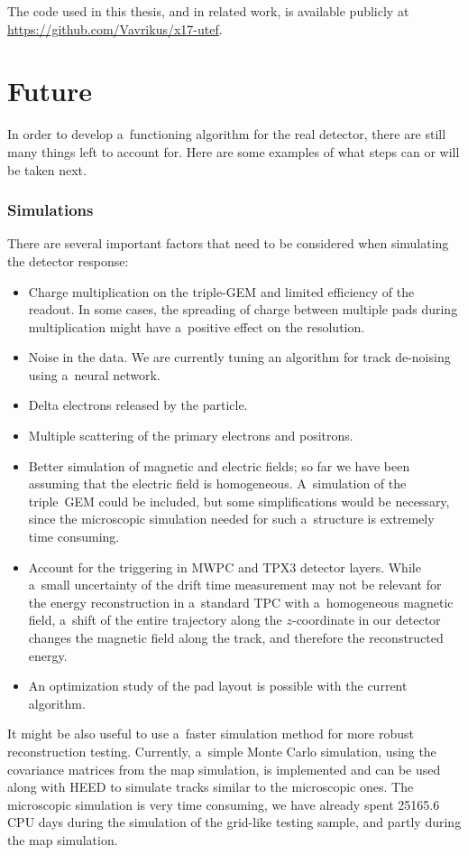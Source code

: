 		The code used in this thesis, and in related work, is available publicly at \url{https://github.com/Vavrikus/x17-utef}.
	\section*{Future}
		In order to develop a~functioning algorithm for the real detector, there are still many things left to account for. Here are some examples of what steps can or will be taken next.
		
	\subsubsection*{Simulations}
		There are several important factors that need to be considered when simulating the detector response:
		\begin{itemize}
			\item Charge multiplication on the triple-\ac{GEM} and limited efficiency of the readout. In some cases, the spreading of charge between multiple pads during multiplication might have a~positive effect on the resolution.
			\item Noise in the data. We are currently tuning an algorithm for track de-noising using a~neural network.
			\item Delta electrons released by the particle.
			\item Multiple scattering of the primary electrons and positrons.
			\item Better simulation of magnetic and electric fields; so far we have been assuming that the electric field is homogeneous. A~simulation of the triple~\ac{GEM} could be included, but some simplifications would be necessary, since the microscopic simulation needed for such a~structure is extremely time consuming.
			\item Account for the triggering in \ac{MWPC} and \acf{TPX3} detector layers. While a~small uncertainty of the drift time measurement may not be relevant for the energy reconstruction in a~standard \ac{TPC} with a~homogeneous magnetic field, a~shift of the entire trajectory along the $z$\nobreakdash-coordinate in our detector changes the magnetic field along the track, and therefore the reconstructed energy.
			\item An optimization study of the pad layout is possible with the current algorithm.
		\end{itemize}
		It might be also useful to use a~faster simulation method for more robust reconstruction testing. Currently, a~simple Monte Carlo simulation, using the covariance matrices from the map simulation, is implemented and can be used along with \ac{HEED} to simulate tracks similar to the microscopic ones. The microscopic simulation is very time consuming, we have already spent \num{25165.6} CPU days during the simulation of the grid-like testing sample, and partly during the map simulation.
		
